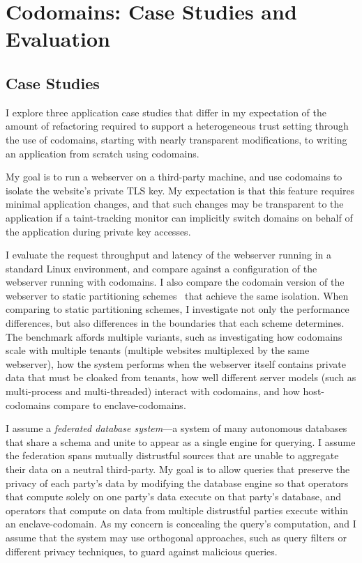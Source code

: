 \section{Codomains: Case Studies and Evaluation}
\label{sec:codomains-eval}

\subsection{Case Studies}

I explore three application case studies that differ in my expectation of the
amount of refactoring required to support a heterogeneous trust setting through
the use of codomains, starting with nearly transparent modifications, to
writing an application from scratch using codomains.


%
My goal is to run a webserver on a third-party machine, and use codomains to
isolate the website's private TLS key.
%
My expectation is that this feature requires minimal application changes,
and that such changes may be transparent to the application if a taint-tracking
monitor can implicitly switch domains on behalf of the application during
private key accesses.


I evaluate the request throughput and latency of the webserver running in a
standard Linux environment, and compare against a configuration of the
webserver running with codomains.
%
I also compare the codomain version of the webserver to 
static partitioning schemes~\cite{eleos,glamdring,privtrans} that achieve
the same isolation.
%
When comparing to static partitioning schemes, I investigate not only the
performance differences, but also differences in the boundaries that
each scheme determines.
%
The benchmark affords multiple variants, such as investigating how codomains
scale with multiple tenants (multiple websites multiplexed by the same
webserver), how the system performs when the webserver itself contains private
data that must be cloaked from tenants, how well different server models (such
as multi-process and multi-threaded) interact with codomains, and how
host-codomains compare to enclave-codomains.


%
I assume a \emph{federated database system}---a system of many
autonomous databases that share a schema and unite to appear as a single
engine for querying. 
%
I assume the federation spans mutually distrustful sources that are unable to 
aggregate their data on a neutral third-party.
%
My goal is to allow queries that preserve the privacy of each party's data by
modifying the database engine so that operators that compute solely on one
party's data execute on that party's database, and operators that compute on
data from multiple distrustful parties execute within an enclave-codomain.
%
As my concern is concealing the query's computation, and I assume that the
system may use orthogonal approaches, such as query filters or different
privacy techniques, to guard against malicious queries.



